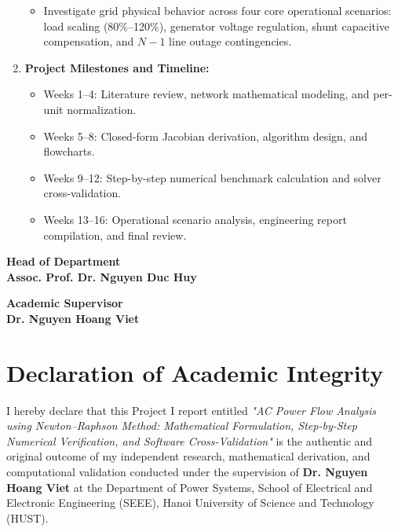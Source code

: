 \documentclass[12pt,a4paper,oneside]{report}
\begin{document}
\begin{spacing}{1.15}
\begin{enumerate}
\begin{itemize}
        \item Investigate grid physical behavior across four core operational scenarios: load scaling (80\%--120\%), generator voltage regulation, shunt capacitive compensation, and $N-1$ line outage contingencies.
    \end{itemize}
    \item \textbf{Project Milestones and Timeline:}
    \begin{itemize}\setlength{\itemsep}{0.5pt}\setlength{\parskip}{0pt}
        \item Weeks 1--4: Literature review, network mathematical modeling, and per-unit normalization.
        \item Weeks 5--8: Closed-form Jacobian derivation, algorithm design, and flowcharts.
        \item Weeks 9--12: Step-by-step numerical benchmark calculation and solver cross-validation.
        \item Weeks 13--16: Operational scenario analysis, engineering report compilation, and final review.
    \end{itemize}
\end{enumerate}

\vspace{18pt}
\noindent
\begin{minipage}[t]{0.48\textwidth}
    \centering
    \textbf{Head of Department}\\[35pt]
    \textbf{Assoc. Prof. Dr. Nguyen Duc Huy}
\end{minipage}
\hfill
\begin{minipage}[t]{0.48\textwidth}
    \centering
    \textbf{Academic Supervisor}\\[35pt]
    \textbf{Dr. Nguyen Hoang Viet}
\end{minipage}
\end{spacing}

\clearpage

\chapter*{Declaration of Academic Integrity}

I hereby declare that this Project I report entitled \textit{"AC Power Flow Analysis using Newton--Raphson Method: Mathematical Formulation, Step-by-Step Numerical Verification, and Software Cross-Validation"} is the authentic and original outcome of my independent research, mathematical derivation, and computational validation conducted under the supervision of \textbf{Dr. Nguyen Hoang Viet} at the Department of Power Systems, School of Electrical and Electronic Engineering (SEEE), Hanoi University of Science and Technology (HUST).
\end{document}
